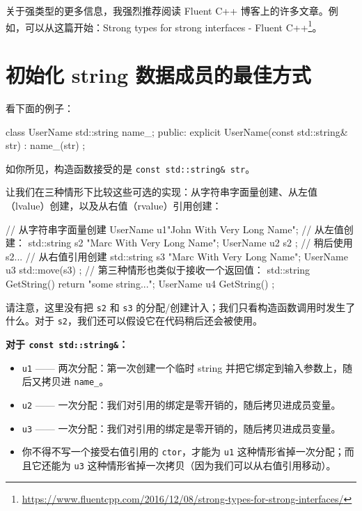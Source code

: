 \begin{myInfoBox}
关于强类型的更多信息，我强烈推荐阅读 Fluent C++ 博客上的许多文章。例如，可以从这篇开始：Strong types for strong interfaces - Fluent C++\footnote{\url{https://www.fluentcpp.com/2016/12/08/strong-types-for-strong-interfaces/}}。
\end{myInfoBox}


\section{初始化 string 数据成员的最佳方式}

看下面的例子：

\begin{codebox}[cpp]
class UserName {
std::string name_;
public:
explicit UserName(const std::string& str) : name_(str) { }
};
\end{codebox}

如你所见，构造函数接受的是 \texttt{const std::string\& str}。

让我们在三种情形下比较这些可选的实现：从字符串字面量创建、从左值（lvalue）创建，以及从右值（rvalue）引用创建：

\begin{codebox}[cpp]
// 从字符串字面量创建
UserName u1{"John With Very Long Name"};
// 从左值创建：
std::string s2 {"Marc With Very Long Name"};
UserName u2 { s2 };
// 稍后使用 s2...
// 从右值引用创建
std::string s3 {"Marc With Very Long Name"};
UserName u3 { std::move(s3) };
// 第三种情形也类似于接收一个返回值：
std::string GetString() { return "some string..."; }
UserName u4 { GetString() };
\end{codebox}

请注意，这里没有把 \texttt{s2} 和 \texttt{s3} 的分配/创建计入；我们只看构造函数调用时发生了什么。对于 \texttt{s2}，我们还可以假设它在代码稍后还会被使用。

\textbf{对于 \texttt{const std::string\&}：}

\begin{itemize}
\item \texttt{u1} —— 两次分配：第一次创建一个临时 string 并把它绑定到输入参数上，随后又拷贝进 \texttt{name\_}。
\item \texttt{u2} —— 一次分配：我们对引用的绑定是零开销的，随后拷贝进成员变量。
\item \texttt{u3} —— 一次分配：我们对引用的绑定是零开销的，随后拷贝进成员变量。
\item 你不得不写一个接受右值引用的 \texttt{ctor}，才能为 \texttt{u1} 这种情形省掉一次分配；而且它还能为 \texttt{u3} 这种情形省掉一次拷贝（因为我们可以从右值引用移动）。
\end{itemize}

